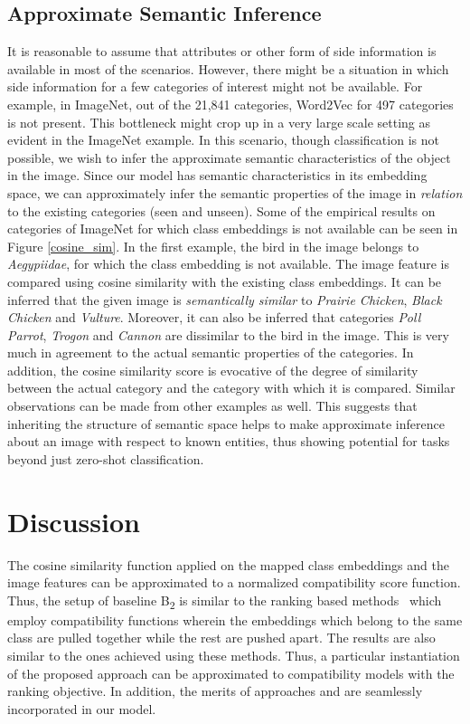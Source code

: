 \documentclass[10pt,twocolumn,letterpaper]{article}
\begin{document}
\subsection{Approximate Semantic Inference}
\label{approx_semantic_inference} 
It is reasonable to assume that attributes or other form of side information is available in most of the scenarios. However, there might be a situation in which side information for a few categories of interest might not be available. For example, in ImageNet, out of the 21,841 categories, Word2Vec for 497 categories is not present. This bottleneck might crop up in a very large scale setting as evident in the ImageNet example. In this scenario, though classification is not possible, we wish to infer the approximate semantic characteristics of the object in the image. Since our model has semantic characteristics in its embedding space, we can approximately infer the semantic properties of the image in \textit{relation} to the existing categories (seen and unseen). Some of the empirical results on categories of ImageNet for which class embeddings is not available can be seen in Figure \ref{cosine_sim}. 
In the first example, the bird in the image belongs to \textit{Aegypiidae}, for which the class embedding is not available. The image feature is compared using cosine similarity with the existing class embeddings. It can be inferred that the given image is \textit{semantically similar} to \textit{Prairie Chicken}, \textit{Black Chicken} and \textit{Vulture}. Moreover, it can also be inferred that categories \textit{Poll Parrot}, \textit{Trogon} and \textit{Cannon} are dissimilar to the bird in the  image. This is very much in agreement to the actual semantic properties of the categories. In addition, the cosine similarity score is evocative of the degree of similarity between the actual category and the category with which it is compared. Similar observations can be made from other examples as well. This suggests that inheriting the structure of semantic space helps to make approximate inference about  an image with respect to known entities, thus showing potential for tasks beyond just zero-shot classification.
\section{Discussion}
\label{discuss}
The cosine similarity function applied on the mapped class embeddings and the image features can be approximated to a normalized compatibility score function.  Thus, the setup of baseline B\textsubscript{2} is similar to the ranking based methods~\cite{akata2013label,xian2016latent,frome2013devise} which employ compatibility functions wherein the embeddings which belong to the same class are pulled together while the rest are pushed apart. 
The results are also similar to the ones achieved using these methods. Thus, a particular instantiation of the proposed approach can be approximated to compatibility models with the ranking objective.
In addition, the merits of approaches \cite{Kodirov_2017_CVPR} and \cite{zhang2016learning} are seamlessly incorporated in our model.
\end{document}

